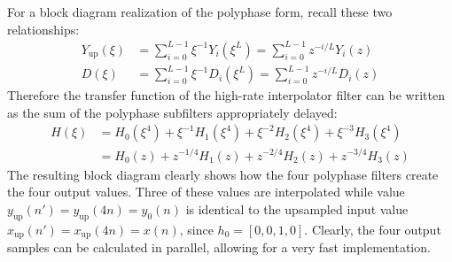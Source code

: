 For a block diagram realization of the polyphase form, recall these two relationships:
\begin{align*}
  Y_{\text{up}}(\xi) &= \sum_{i=0}^{L-1}\xi^{-1}Y_i(\xi^L) = \sum_{i=0}^{L-1}z^{-i/L}Y_i(z) \\
  D(\xi) &= \sum_{i=0}^{L-1}\xi^{-1}D_i(\xi^L) = \sum_{i=0}^{L-1}z^{-i/L}D_i(z)
\end{align*}
Therefore the transfer function of the high-rate interpolator filter can be written as the sum of the polyphase subfilters appropriately delayed:
\begin{align*}
  H(\xi) &= H_0(\xi^4) + \xi^{-1}H_1(\xi^4) + \xi^{-2}H_2(\xi^4) + \xi^{-3}H_3(\xi^4) \\
  &= H_0(z) + z^{-1/4}H_1(z) + z^{-2/4}H_2(z) + z^{-3/4}H_3(z)
\end{align*}
The resulting block diagram clearly shows how the four polyphase filters create the four output values.
Three of these values are interpolated while value $y_{\text{up}}(n') = y_{\text{up}}(4n) = y_0(n)$ is identical to the upsampled input value $x_{\text{up}}(n') = x_{\text{up}}(4n) = x(n)$, since $h_0=[0,0,1,0]$.
Clearly, the four output samples can be calculated in parallel, allowing for a very fast implementation.
\begin{center}
\end{center}

